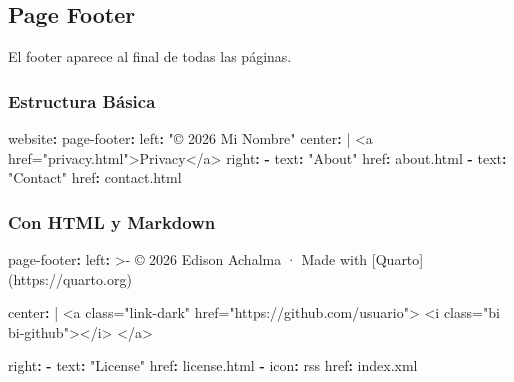 \documentclass[
  doc,
  floatsintext,
  longtable,
  a4paper,
  nolmodern,
  notxfonts,
  notimes,
  12pt,
  colorlinks=true,linkcolor=blue,citecolor=blue,urlcolor=blue]{apa7}
\newenvironment{Shaded}{\begin{snugshade}}{\end{snugshade}}
\newcommand{\AttributeTok}[1]{\textcolor[rgb]{0.40,0.45,0.13}{#1}}
\newcommand{\CharTok}[1]{\textcolor[rgb]{0.13,0.47,0.30}{#1}}
\newcommand{\FunctionTok}[1]{\textcolor[rgb]{0.28,0.35,0.67}{#1}}
\newcommand{\KeywordTok}[1]{\textcolor[rgb]{0.00,0.23,0.31}{\textbf{#1}}}
\newcommand{\NormalTok}[1]{\textcolor[rgb]{0.00,0.23,0.31}{#1}}
\newcommand{\StringTok}[1]{\textcolor[rgb]{0.13,0.47,0.30}{#1}}
\begin{document}
\subsection{Page Footer}\label{page-footer}

El footer aparece al final de todas las páginas.

\subsubsection{Estructura Básica}\label{estructura-buxe1sica-2}

\begin{Shaded}
\begin{Highlighting}[]
\FunctionTok{website}\KeywordTok{:}
\AttributeTok{  }\FunctionTok{page{-}footer}\KeywordTok{:}
\AttributeTok{    }\FunctionTok{left}\KeywordTok{:}\AttributeTok{ }\StringTok{"© 2026 Mi Nombre"}
\FunctionTok{    center}\KeywordTok{: }\CharTok{|}
\NormalTok{      \textless{}a href="privacy.html"\textgreater{}Privacy\textless{}/a\textgreater{}}
\AttributeTok{    }\FunctionTok{right}\KeywordTok{:}
\AttributeTok{      }\KeywordTok{{-}}\AttributeTok{ }\FunctionTok{text}\KeywordTok{:}\AttributeTok{ }\StringTok{"About"}
\AttributeTok{        }\FunctionTok{href}\KeywordTok{:}\AttributeTok{ about.html}
\AttributeTok{      }\KeywordTok{{-}}\AttributeTok{ }\FunctionTok{text}\KeywordTok{:}\AttributeTok{ }\StringTok{"Contact"}
\AttributeTok{        }\FunctionTok{href}\KeywordTok{:}\AttributeTok{ contact.html}
\end{Highlighting}
\end{Shaded}

\subsubsection{Con HTML y Markdown}\label{con-html-y-markdown}

\begin{Shaded}
\begin{Highlighting}[]
\FunctionTok{page{-}footer}\KeywordTok{:}
\FunctionTok{  left}\KeywordTok{: }\CharTok{\textgreater{}{-}}
\NormalTok{    © 2026 Edison Achalma · Made with [Quarto](https://quarto.org)}
    
\FunctionTok{  center}\KeywordTok{: }\CharTok{|}
\NormalTok{    \textless{}a class="link{-}dark" href="https://github.com/usuario"\textgreater{}}
\NormalTok{      \textless{}i class="bi bi{-}github"\textgreater{}\textless{}/i\textgreater{}}
\NormalTok{    \textless{}/a\textgreater{}}
    
\AttributeTok{  }\FunctionTok{right}\KeywordTok{:}
\AttributeTok{    }\KeywordTok{{-}}\AttributeTok{ }\FunctionTok{text}\KeywordTok{:}\AttributeTok{ }\StringTok{"License"}
\AttributeTok{      }\FunctionTok{href}\KeywordTok{:}\AttributeTok{ license.html}
\AttributeTok{    }\KeywordTok{{-}}\AttributeTok{ }\FunctionTok{icon}\KeywordTok{:}\AttributeTok{ rss}
\AttributeTok{      }\FunctionTok{href}\KeywordTok{:}\AttributeTok{ index.xml}
\end{Highlighting}
\end{Shaded}
\end{document}

